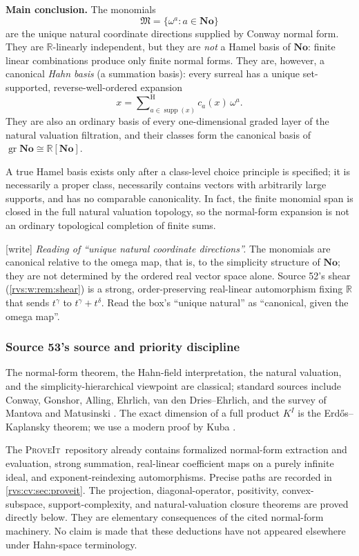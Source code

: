 \documentclass[11pt,letterpaper]{article}
\numberwithin{equation}{section}
\theoremstyle{definition}
\theoremstyle{remark}
\newcommand{\No}{\mathbf{No}}
\newcommand{\R}{\mathbb{R}}
\newcommand{\M}{\mathfrak{M}}
\newcommand{\supp}{\operatorname{supp}}
\newcommand{\gr}{\operatorname{gr}}
\newcommand{\HSum}{\mathop{\sum}\nolimits^{\mathrm H}}
\newcommand{\repo}{\textsc{ProveIt}}
\newcommand{\wtag}{\textup{[write]}}%
\begin{document}
\begin{resultbox}
\textbf{Main conclusion.}
The monomials
\[
  \M=\{\omega^a:a\in\No\}
\]
are the unique natural coordinate directions supplied by Conway normal form.
They are $\R$-linearly independent, but they are \emph{not} a Hamel basis of
$\No$: finite linear combinations produce only finite normal forms. They are,
however, a canonical \emph{Hahn basis} (a summation basis): every surreal has a
unique set-supported, reverse-well-ordered expansion
\[
  x=\HSum_{a\in\supp(x)} c_a(x)\,\omega^a.
\]
They are also an ordinary basis of every one-dimensional graded layer of the
natural valuation filtration, and their classes form the canonical basis of
\(\gr\No\cong\R[\No]\).

A true Hamel basis exists only after a class-level choice principle is specified;
it is necessarily a proper class, necessarily contains vectors with arbitrarily
large supports, and has no comparable canonicality. In fact, the finite monomial
span is closed in the full natural valuation topology, so the normal-form expansion
is not an ordinary topological completion of finite sums.
\end{resultbox}

\noindent\wtag{} \emph{Reading of ``unique natural coordinate directions''.}
The monomials are canonical relative to the omega map, that is, to the
simplicity structure of \(\No\); they are not determined by the ordered real
vector space alone.  Source 52's shear (\cref{rvs:w:rem:shear}) is a strong,
order-preserving real-linear automorphism fixing \(\R\) that sends
\(t^\gamma\) to \(t^\gamma+t^\delta\).  Read the box's ``unique natural''
as ``canonical, given the omega map''.

\subsubsection*{Source 53's source and priority discipline}

The normal-form theorem, the Hahn-field interpretation, the natural valuation,
and the simplicity-hierarchical viewpoint are classical; standard sources include
Conway, Gonshor, Alling, Ehrlich, van den Dries--Ehrlich, and the survey of Mantova
and Matusinski \cite{Conway,Gonshor,Alling,Ehrlich2001,Ehrlich2011,vdDE,MantovaMatusinski}.
The exact dimension of a full product $K^I$ is the Erd\H{o}s--Kaplansky theorem;
we use a modern proof by Kuba \cite{Kuba}.

The \repo\ repository already contains formalized normal-form extraction and
evaluation, strong summation, real-linear coefficient maps on a purely infinite
ideal, and exponent-reindexing automorphisms. Precise paths are recorded in
\cref{rvs:cv:sec:proveit}. The projection, diagonal-operator, positivity, convex-subspace,
support-complexity, and natural-valuation closure theorems are proved directly
below. They are elementary consequences of the cited normal-form machinery. No
claim is made that these deductions have not appeared elsewhere under Hahn-space
terminology.
\end{document}

